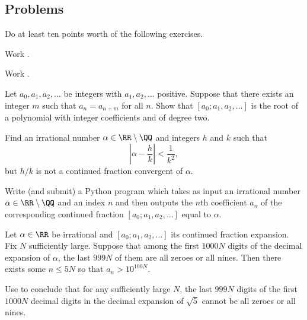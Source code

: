 \documentclass[../notes.tex]{subfiles}
\begin{document}
\subsection{Problems}
Do at least ten points worth of the following exercises.
\begin{prob}[2 points]
	Work .
\end{prob}
\begin{prob}[3 points]
	Work .
\end{prob}
\begin{prob}[3 points]
	Let $a_0,a_1,a_2,\ldots$ be integers with $a_1,a_2,\ldots$ positive. Suppose that there exists an integer $m$ such that $a_n=a_{n+m}$ for all $n$. Show that $[a_0;a_1,a_2,\ldots]$ is the root of a polynomial with integer coefficients and of degree two.
\end{prob}
\begin{prob}[4 points]
	Find an irrational number $\alpha\in\RR\setminus\QQ$ and integers $h$ and $k$ such that
	\[\left|\alpha-\frac hk\right|<\frac1{k^2},\]
	but $h/k$ is not a continued fraction convergent of $\alpha$.
\end{prob}
\begin{prob}[5 points]
	Write (and submit) a Python program which takes as input an irrational number $\alpha\in\RR\setminus\QQ$ and an index $n$ and then outputs the $n$th coefficient $a_n$ of the corresponding continued fraction $[a_0;a_1,a_2,\ldots]$ equal to $\alpha$.
\end{prob}
\begin{prob}[8 points] \label{prob:not-too-many-nines}
	Let $\alpha\in\RR$ be irrational and $[a_0;a_1,a_2,\ldots]$ its continued fraction expansion. Fix $N$ sufficiently large. Suppose that among the first $1000N$ digits of the decimal expansion of $\alpha$, the last $999N$ of them are all zeroes or all nines. Then there exists some $n\le5N$ so that $a_n>10^{100N}$.
\end{prob}
\begin{prob}[2 points]
	Use  to conclude that for any sufficiently large $N$, the last $999N$ digits of the first $1000N$ decimal digits in the decimal expansion of $\sqrt5$ cannot be all zeroes or all nines.
\end{prob}
\end{document}
